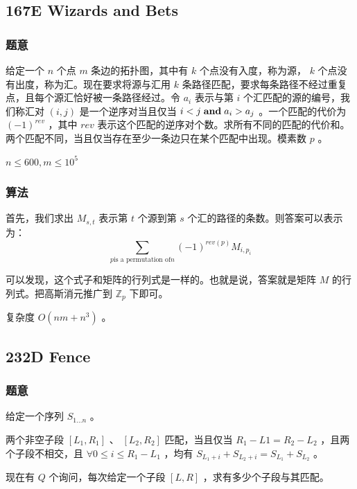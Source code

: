 \documentclass[11pt]{article}
\begin{document}
\subsection{167E  Wizards and Bets}
\label{sec-10-1}
\subsubsection{题意}
\label{sec-10-1-1}

    给定一个 $n$ 个点 $m$ 条边的拓扑图，其中有 $k$ 个点没有入度，称为源， $k$ 个点没有出度，称为汇。现在要求将源与汇用 $k$ 条路径匹配，要求每条路径不经过重复点，且每个源汇恰好被一条路径经过。令 $a_i$ 表示与第 $i$ 个汇匹配的源的编号，我们称汇对 $(i, j)$ 是一个逆序对当且仅当 $i < j \hspace{0.1cm} \textbf{and} \hspace{0.1cm} a_i > a_j$ 。一个匹配的代价为 $(-1)^{rev}$ ，其中 $rev$ 表示这个匹配的逆序对个数。求所有不同的匹配的代价和。两个匹配不同，当且仅当存在至少一条边只在某个匹配中出现。模素数 $p$ 。

    $n \leq 600, m \leq 10^5$
\subsubsection{算法}
\label{sec-10-1-2}

    首先，我们求出 $M_{s, t}$ 表示第 $t$ 个源到第 $s$ 个汇的路径的条数。则答案可以表示为：
    $$\sum_{p \text{is a permutation of} n} (-1)^{rev (p)} M_{i, p_i}$$

    可以发现，这个式子和矩阵的行列式是一样的。也就是说，答案就是矩阵 $M$ 的行列式。把高斯消元推广到 $\mathbb{Z}_p$ 下即可。

    复杂度 $O(nm + n^3)$ 。
\subsection{232D  Fence}
\label{sec-10-2}
\subsubsection{题意}
\label{sec-10-2-1}

    给定一个序列 $S_{1 \dots n}$ 。

\begin{definition}
  两个非空子段 $[L_1, R_1]$ 、 $[L_2, R_2]$ 匹配，当且仅当 $R_1 - L1 = R_2 - L_2$ ，且两个子段不相交，且 $\forall 0 \leq i \leq R_1 - L_1$ ，均有 $S_{L_1 + i} + S_{L_2 + i} = S_{L_1} + S_{L_2}$ 。
\end{definition}

    现在有 $Q$ 个询问，每次给定一个子段 $[L, R]$ ，求有多少个子段与其匹配。
\end{document}
